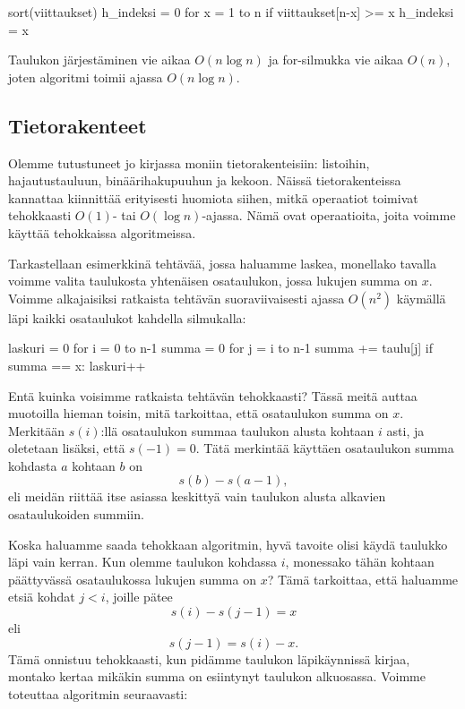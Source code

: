 \begin{code}
sort(viittaukset)
h_indeksi = 0
for x = 1 to n
    if viittaukset[n-x] >= x
        h_indeksi = x
\end{code}

Taulukon järjestäminen vie aikaa $O(n \log n)$ ja for-silmukka vie aikaa $O(n)$,
joten algoritmi toimii ajassa $O(n \log n)$.

\subsection{Tietorakenteet}

Olemme tutustuneet jo kirjassa moniin tietorakenteisiin:
listoihin, hajautustauluun, binäärihakupuuhun ja kekoon.
Näissä tietorakenteissa kannattaa kiinnittää erityisesti huomiota siihen,
mitkä operaatiot toimivat tehokkaasti $O(1)$- tai $O(\log n)$-ajassa.
Nämä ovat operaatioita, joita voimme käyttää tehokkaissa algoritmeissa.

Tarkastellaan esimerkkinä tehtävää, jossa haluamme laskea,
monellako tavalla voimme valita taulukosta yhtenäisen osataulukon,
jossa lukujen summa on $x$.
Voimme alkajaisiksi ratkaista tehtävän suoraviivaisesti ajassa $O(n^2)$
käymällä läpi kaikki osataulukot kahdella silmukalla:

\begin{code}
laskuri = 0
for i = 0 to n-1
    summa = 0
    for j = i to n-1
        summa += taulu[j]
        if summa == x:
            laskuri++
\end{code}

Entä kuinka voisimme ratkaista tehtävän tehokkaasti?
Tässä meitä auttaa muotoilla hieman toisin, mitä tarkoittaa,
että osataulukon summa on $x$.
Merkitään $s(i)$:llä osataulukon summaa taulukon alusta
kohtaan $i$ asti, ja oletetaan lisäksi, että $s(-1)=0$.
Tätä merkintää käyttäen osataulukon summa
kohdasta $a$ kohtaan $b$ on
\[s(b)-s(a-1),\]
eli meidän riittää itse asiassa keskittyä vain taulukon alusta
alkavien osataulukoiden summiin.

Koska haluamme saada tehokkaan algoritmin,
hyvä tavoite olisi käydä taulukko läpi vain kerran.
Kun olemme taulukon kohdassa $i$,
monessako tähän kohtaan päättyvässä osataulukossa
lukujen summa on $x$?
Tämä tarkoittaa, että haluamme etsiä kohdat $j<i$,
joille pätee
\[s(i)-s(j-1)=x\]
eli
\[s(j-1)=s(i)-x.\]
Tämä onnistuu tehokkaasti, kun pidämme taulukon läpikäynnissä
kirjaa, montako kertaa mikäkin summa on esiintynyt taulukon alkuosassa.
Voimme toteuttaa algoritmin seuraavasti:

